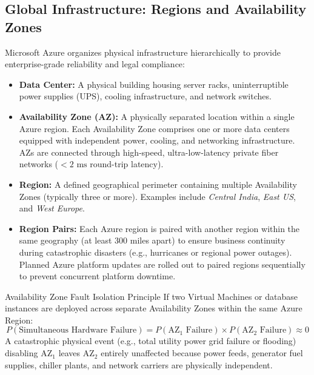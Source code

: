 \subsection{Global Infrastructure: Regions and Availability Zones}
Microsoft Azure organizes physical infrastructure hierarchically to provide enterprise-grade reliability and legal compliance:
\begin{itemize}[leftmargin=*]
  \item \textbf{Data Center:} A physical building housing server racks, uninterruptible power supplies (UPS), cooling infrastructure, and network switches.
  \item \textbf{Availability Zone (AZ):} A physically separated location within a single Azure region. Each Availability Zone comprises one or more data centers equipped with independent power, cooling, and networking infrastructure. AZs are connected through high-speed, ultra-low-latency private fiber networks ($< 2\text{ ms}$ round-trip latency).
  \item \textbf{Region:} A defined geographical perimeter containing multiple Availability Zones (typically three or more). Examples include \emph{Central India}, \emph{East US}, and \emph{West Europe}.
  \item \textbf{Region Pairs:} Each Azure region is paired with another region within the same geography (at least 300 miles apart) to ensure business continuity during catastrophic disasters (e.g., hurricanes or regional power outages). Planned Azure platform updates are rolled out to paired regions sequentially to prevent concurrent platform downtime.
\end{itemize}

\begin{thmbox}{Availability Zone Fault Isolation Principle}
If two Virtual Machines or database instances are deployed across separate Availability Zones within the same Azure Region:
\begin{equation}
P(\text{Simultaneous Hardware Failure}) = P(\text{AZ}_1\text{ Failure}) \times P(\text{AZ}_2\text{ Failure}) \approx 0
\end{equation}
A catastrophic physical event (e.g., total utility power grid failure or flooding) disabling $\text{AZ}_1$ leaves $\text{AZ}_2$ entirely unaffected because power feeds, generator fuel supplies, chiller plants, and network carriers are physically independent.
\end{thmbox}

